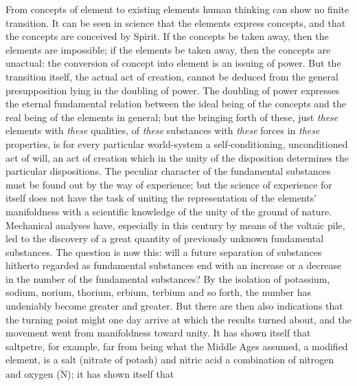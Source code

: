 \documentclass[12pt,a4paper]{book}
\begin{document}
From concepts of element to existing elements human thinking can show no finite transition. It can be seen in science
that the elements express concepts, and that the concepts are conceived by Spirit. If the concepts be taken away, then
the elements are impossible; if the elements be taken away, then the concepts are unactual: the conversion of concept
into element is an issuing of power. But the transition itself, the actual act of creation, cannot be deduced from the
general presupposition lying in the doubling of power. The doubling of power expresses the eternal fundamental relation
between the ideal being of the concepts and the real being of the elements in general; but the bringing forth
of these, just \emph{these} elements with \emph{these} qualities, of \emph{these} substances with \emph{these} forces
in \emph{these} properties, is for every particular world-system a self-conditioning, unconditioned act of will, an act
of creation which in the unity of the disposition determines the particular dispositions.
The peculiar character of the fundamental substances must be found out by the way of experience; but the science
of experience for itself does not have the task of uniting the representation of the elements' manifoldness with
a scientific knowledge
of the unity of the ground of nature. Mechanical analyses have, especially in this century by means of the
voltaic pile, led to the discovery of a great quantity of previously unknown fundamental substances. The question
is now this: will a future separation of substances hitherto regarded as fundamental substances end with an
increase or a decrease in the number of the fundamental substances? By the isolation of potassium, sodium,
norium, thorium, erbium, terbium and so forth, the number has undeniably become greater and greater. But there
are then also indications that the turning point might one day arrive at which the results turned about, and the
movement went from manifoldness toward unity. It has shown itself that saltpetre, for example, far from being what
the Middle Ages assumed, a modified element, is a salt (nitrate of potash)
and nitric acid a combination of nitrogen and oxygen ($\ddot{\dddot{\mathrm{N}}}$); it has shown itself that
\end{document}
